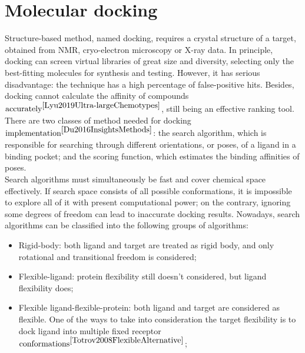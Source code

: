 \section{Molecular docking}
  Structure-based method, named docking, requires a crystal structure of a target, obtained from NMR, cryo-electron microscopy or X-ray data.
  In principle, docking can screen virtual libraries of great size and diversity, selecting only the best-fitting molecules for synthesis and testing. 
  However, it has serious disadvantage: the technique has a high percentage of false-positive hits. 
  Besides, docking cannot calculate the affinity of compounds $\text{accurately}^{\cite{Lyu2019Ultra-largeChemotypes}}$, still being an effective ranking tool.\\
  
  There are two classes of method needed for docking $\text{implementation}^{\cite{Du2016InsightsMethods}}$: the search algorithm, which is responsible for searching through different orientations, or poses, of a ligand in a binding pocket; and the scoring function, which estimates the binding affinities of poses.\\
  
  Search algorithms must simultaneously be fast and cover chemical space effectively.
  If search space consists of all possible conformations, it is impossible to explore all of it with present computational power; on the contrary, ignoring some degrees of freedom can lead to inaccurate docking results.
  Nowadays, search algorithms can be classified into the following groups of algorithms:
  \begin{itemize}
      \item 
      Rigid-body: both ligand and target are treated as rigid body, and only rotational and transitional freedom is considered;
      \item Flexible-ligand: protein flexibility still doesn't considered, but ligand flexibility does;
      \item Flexible ligand-flexible-protein: both ligand and target are considered as flexible. One of the ways to take into consideration the target flexibility is to dock ligand into multiple fixed receptor $\text{conformations}^{\cite{Totrov2008FlexibleAlternative}}$;
  \end{itemize}
  
